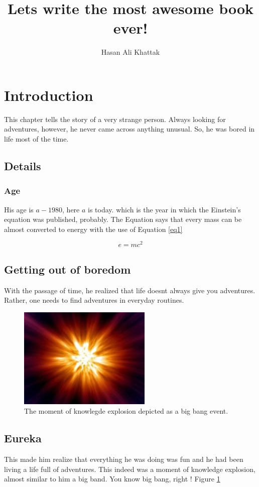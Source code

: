 \documentclass[twocolumn]{article}
\title{Lets write the most awesome book ever!}
\author{Hasan Ali Khattak}
\begin{document}
\maketitle

\section*{Introduction}
This chapter tells the story of a very strange person. Always looking for adventures, however, he never came across anything unusual. So, he was bored in life most of the time.

\subsection*{Details}
\subsubsection*{Age}
His age is $ a - 1980$, here $a$ is today. which is the year in which the Einstein's equation was published, probably. %
The Equation says that every mass can be almost converted to energy with the use of Equation \ref{eq1}

\begin{equation}\label{eq1}
    e = m c^2
\end{equation}

\subsection{Getting out of boredom}
With the passage of time, he realized that life doesnt always give you adventures. Rather, one needs to find adventures in everyday routines.

\begin{figure}[pb]
    \centering
    \includegraphics[width=0.5\linewidth,]{figs/bigBangPicture.png}
    \caption{The moment of knowlegde explosion depicted as a big bang event.}
    \label{fig1:bigBangPicture}
\end{figure}

\subsection{Eureka}
This made him realize that everything he was doing was fun and he had been living a life full of adventures. This indeed was a moment of knowledge explosion, almost similar to him a big band. You know big bang, right ! Figure \ref{fig1:bigBangPicture}
\end{document}
